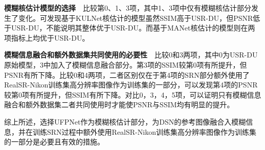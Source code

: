 \noindent\textbf{模糊核估计模型的选择}\ \ 比较第0、1、3项，其中1、3项中仅有模糊核估计部分发生了变化。可发现基于KULNet核估计的模型虽然SSIM高于USR-DU，但PSNR低于USR-DU，不能说明其整体优于USR-DU。而基于MANet核估计的模型则在两项指标上均优于USR-DU。

\noindent\textbf{模糊信息融合和额外数据集共同使用的必要性}\ \ 比较0和3两项，其中0为USR-DU原始模型，3中加入了模糊信息融合部分。第3项的SSIM较第0项有所提升，但PSNR有所下降。比较0和4两项，二者区别仅在于第4项的SRN部分额外使用了RealSR-Nikon训练集高分辨率图像作为训练集的一部分，可以发现第4项的PSNR较第0项有所提升，但SSIM有所下降。对比0，3，4，5项，可以证明只有模糊信息融合和额外数据集二者共同使用时才能使PSNR与SSIM均有明显的提升。

综上所述，选择UFPNet作为模糊核估计部分，为DSN的参考图像融合入模糊信息，并在训练SRN过程中额外使用RealSR-Nikon训练集高分辨率图像作为训练集的一部分是必要且有效的措施。

